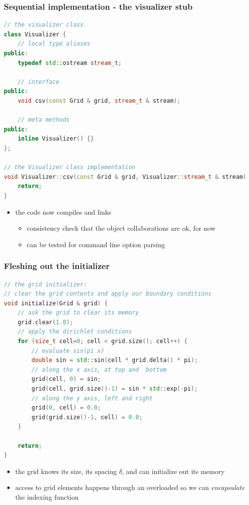 \begin{frame}[fragile]
%
  \frametitle{Sequential implementation - the visualizer stub}
%
  \begin{lstlisting}[language=c++,name=seq:frame, firstnumber=97]
// the visualizer class
class Visualizer {
    // local type aliases
public:
    typedef std::ostream stream_t;

    // interface
public:
    void csv(const Grid & grid, stream_t & stream);

    // meta methods
public:
    inline Visualizer() {}
};

// the Visualizer class implementation
void Visualizer::csv(const Grid & grid, Visualizer::stream_t & stream) {
    return;
}
  \end{lstlisting}
%

\begin{itemize}
\item the code now compiles and links
  \begin{itemize}
  \item consistency check that the object collaborations are ok, for now
  \item can be tested for command line option parsing
  \end{itemize}
\end{itemize}
% 
\end{frame}

\begin{frame}[fragile]
%
  \frametitle{Fleshing out the initializer}
%
  \begin{lstlisting}[language=c++,name=seq:initializer]
// the grid initializer:
// clear the grid contents and apply our boundary conditions 
void initialize(Grid & grid) {
    // ask the grid to clear its memory
    grid.clear(1.0);
    // apply the dirichlet conditions
    for (size_t cell=0; cell < grid.size(); cell++) {
        // evaluate sin(pi x)
        double sin = std::sin(cell * grid.delta() * pi);
        // along the x axis, at top and  bottom
        grid(cell, 0) = sin;
        grid(cell, grid.size()-1) = sin * std::exp(-pi);
        // along the y axis, left and right
        grid(0, cell) = 0.0;
        grid(grid.size()-1, cell) = 0.0;
    }

    return;
}
  \end{lstlisting}
%
  \begin{itemize}
  \item the grid knows its size, its spacing $\delta$, and can initialize out its  memory
  \item access to grid elements happens through an overloaded  so we can
    {\em encapsulate} the indexing function
  \end{itemize}
%
\end{frame}

